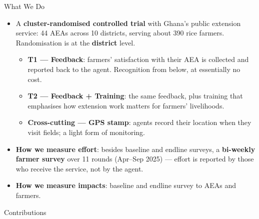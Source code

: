 \documentclass[aspectratio=169]{beamer}
\begin{document}
\begin{frame}{What We Do}
	\begin{itemize}\small
		\item A \textbf{cluster-randomised controlled trial} with Ghana's public extension
		service: 44 AEAs across 10 districts, serving about 390 rice farmers. Randomisation is
		at the \textbf{district} level.
        \begin{itemize}
            \item \textbf{T1 --- Feedback}: farmers' satisfaction with their AEA is collected and
		reported back to the agent. Recognition from below, at essentially no cost.
            \item \textbf{T2 --- Feedback + Training}: the same feedback, plus training that emphasises how extension work matters for farmers' livelihoods.
            \item \textbf{Cross-cutting --- GPS stamp}: agents record their location when they visit
		fields; a light form of monitoring.
        \end{itemize}

		\vspace{0.18cm}
		\item \textbf{How we measure effort}: besides baseline and endline surveys, a
		\textbf{bi-weekly farmer survey} over 11 rounds (Apr--Sep 2025) --- effort is reported by
		those who receive the service, not by the agent.

        \vspace{0.18cm}
		\item \textbf{How we measure impacts}: baseline and endline survey to AEAs and farmers.

	\end{itemize}
\end{frame}


\begin{frame}{Contributions}
    
\end{frame}
\end{document}
